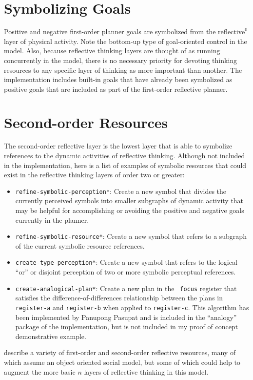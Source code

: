 \section{Symbolizing Goals}

Positive and negative first-order planner goals are symbolized from
the $\text{reflective}^0$ layer of physical activity.  Note the
bottom-up type of goal-oriented control in the model.  Also, because
reflective thinking layers are thought of as running concurrently in
the model, there is no necessary priority for devoting thinking
resources to any specific layer of thinking as more important than
another.  The implementation includes built-in goals that have already
been symbolized as positive goals that are included as part of the
first-order reflective planner.

\section{Second-order Resources}

The second-order reflective layer is the lowest layer that is able to
symbolize references to the dynamic activities of reflective thinking.
Although not included in the implementation, here is a list of
examples of symbolic resources that could exist in the reflective
thinking layers of order two or greater:
\begin{itemize}
\item {\tt refine-symbolic-perception*}: Create a new symbol that
  divides the currently perceived symbols into smaller subgraphs of
  dynamic activity that may be helpful for accomplishing or avoiding
  the positive and negative goals currently in the planner.
\item {\tt refine-symbolic-resource*}: Create a new symbol that refers
  to a subgraph of the current symbolic resource references.
\item {\tt create-type-perception*}: Create a new symbol that refers
  to the logical ``or'' or disjoint perception of two or more symbolic
  perceptual references.
\item {\tt create-analogical-plan*}: Create a new plan in the {\tt
  focus} register that satisfies the \cite{winston:1970}
  difference-of-differences relationship between the plans in {\tt
    register-a} and {\tt register-b} when applied to {\tt register-c}.
  This algorithm has been implemented by Panupong Pasupat and is
  included in the ``analogy'' package of the implementation, but is
  not included in my proof of concept demonstrative example.
\end{itemize}
\cite{singh:2003, singh:2005a} describe a variety of first-order and
second-order reflective resources, many of which assume an object
oriented social model, but some of which could help to augment the
more basic $n$ layers of reflective thinking in this model.


